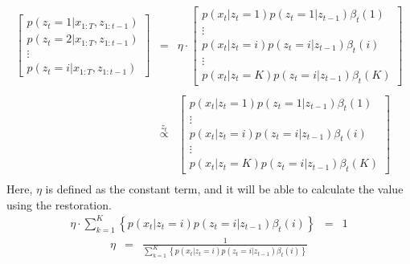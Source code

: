 \documentclass[a4paper]{article}
\newcommand{\proptoas}[1]{\overset{#1}{\propto}}
\begin{document}
\begin{eqnarray}
	\left[
		\begin{array}{c}
			p(z_t = 1 | x_{1:T}, z_{1:t-1}) \\
			p(z_t = 2 | x_{1:T}, z_{1:t-1}) \\
			\vdots \\
			p(z_t = i | x_{1:T}, z_{1:t-1})
		\end{array}
	\right]
	&=&
	\eta \cdot
	\left[
		\begin{array}{c}
			p(x_t | z_t = 1) p(z_t = 1 | z_{t-1}) \beta_t(1) \\
			\vdots \\
			p(x_t | z_t = i) p(z_t = i | z_{t-1}) \beta_t(i) \\
			\vdots \\
			p(x_t | z_t = K) p(z_t = i | z_{t-1}) \beta_t(K)
		\end{array}
	\right] \nonumber \\
	\nonumber \\
	&\proptoas{z_t}&
	\left[
		\begin{array}{c}
			p(x_t | z_t = 1) p(z_t = 1 | z_{t-1}) \beta_t(1) \\
			\vdots \\
			p(x_t | z_t = i) p(z_t = i | z_{t-1}) \beta_t(i) \\
			\vdots \\
			p(x_t | z_t = K) p(z_t = i | z_{t-1}) \beta_t(K)
		\end{array}
	\right] \nonumber \\
\end{eqnarray}
Here, $\eta$ is defined as the constant term, and it will be able to calculate the value using the restoration.
\begin{eqnarray}
	\eta \cdot \sum_{k=1}^{K}{\left\{p(x_t | z_t = i) p(z_t = i | z_{t-1}) \beta_t(i)\right\}} &=& 1
\end{eqnarray}
\begin{eqnarray}
\eta &=& \frac{1}{\sum_{k=1}^{K}{\left\{p(x_t | z_t = i) p(z_t = i | z_{t-1}) \beta_t(i)\right\}}}
\end{eqnarray}
\end{document}
